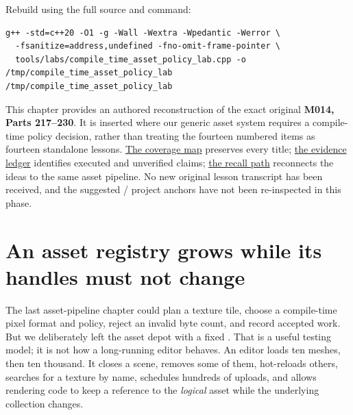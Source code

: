 Rebuild using the full source and command:

\begin{verbatim}
g++ -std=c++20 -O1 -g -Wall -Wextra -Wpedantic -Werror \
  -fsanitize=address,undefined -fno-omit-frame-pointer \
  tools/labs/compile_time_asset_policy_lab.cpp -o /tmp/compile_time_asset_policy_lab
/tmp/compile_time_asset_policy_lab
\end{verbatim}

This chapter provides an authored reconstruction of the exact original \textbf{M014, Parts 217--230}. It is inserted where our generic asset system requires a compile-time policy decision, rather than treating the fourteen numbered items as fourteen standalone lessons. \hyperref[appendix-fd090d982a15-m014-parts-217230-one-tile-planner-and-its-compile-time-policy-decisions]{The coverage map} preserves every title; \hyperref[appendix-a103e7846d21-phase-4-additive-reconstruction-m014-parts-217230]{the evidence ledger} identifies executed and unverified claims; \hyperref[appendix-960160274237-the-tile-planner-makes-a-choice-m014-reconstruction]{the recall path} reconnects the ideas to the same asset pipeline. No new original lesson transcript has been received, and the suggested  /  project anchors have not been re-inspected in this phase.

\section{An asset registry grows while its handles must not change}\label{05-engine-i-ch005-an-asset-registry-grows-while-its-handles-must-not-change}

\hypertarget{05-engine-i-ch005-an-asset-registry-grows-while-its-handles-must-not-change}{}

The last asset-pipeline chapter could plan a texture tile, choose a compile-time pixel format and policy, reject an invalid byte count, and record accepted work. But we deliberately left the asset depot with a fixed . That is a useful testing model; it is not how a long-running editor behaves. An editor loads ten meshes, then ten thousand. It closes a scene, removes some of them, hot-reloads others, searches for a texture by name, schedules hundreds of uploads, and allows rendering code to keep a reference to the \emph{logical} asset while the underlying collection changes.

